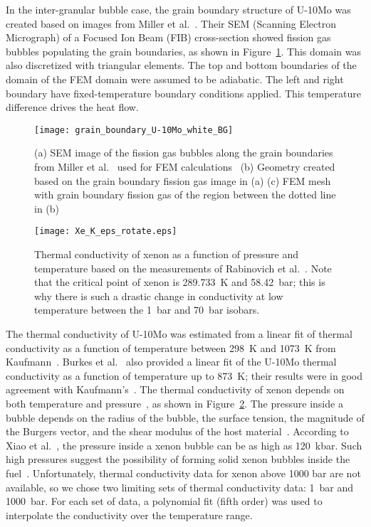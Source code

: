 In the inter-granular bubble case, the grain boundary structure of U-10Mo was created based on images from Miller et al.~\cite{miller2012advantages}. Their SEM (Scanning Electron Micrograph) of a Focused Ion Beam (FIB) cross-section showed fission gas bubbles populating the grain boundaries, as shown in Figure~\ref{fig_Xe_SEM}. This domain was also discretized with triangular elements. The top and bottom boundaries of the domain of the FEM domain were assumed to be adiabatic. The left and right boundary have fixed-temperature boundary conditions applied. This temperature difference drives the heat flow. 


\begin{figure}%
\centering
\texttt{[image: grain\_boundary\_U-10Mo\_white\_BG]}
\caption{(a) SEM image of the fission gas bubbles along the grain boundaries from Miller et al.~\cite{miller2012advantages} used for FEM calculations~\cite{miller2012advantages} (b) Geometry created based on the grain boundary fission gas image in (a) (c) FEM mesh with grain boundary fission gas of the region between the dotted line in  (b) }
\label{fig_Xe_SEM}
\end{figure}
\begin{figure}
\centering
\texttt{[image: Xe\_K\_eps\_rotate.eps]}
\caption{Thermal conductivity of xenon as a function of pressure and
temperature based on the measurements of
Rabinovich et al.~\cite{rabinovich1987thermophysical}.
Note that the critical point of xenon is 289.733~K and 58.42~bar; this is why
there is such a drastic change in conductivity at low temperature between the
1~bar and 70~bar isobars.}
\label{fig_Xe_pressure}
\end{figure}

The thermal conductivity of U-10Mo was estimated from a linear fit of thermal conductivity as a function of temperature between 298~K and 1073~K from Kaufmann~\cite{kaufmann1962nuclear}. Burkes et al.~\cite{burkes2010thermo} also provided a linear fit of the U-10Mo thermal conductivity as a function of temperature up to 873~K; their results were in good agreement with Kaufmann's~\cite{kaufmann1962nuclear}. The thermal conductivity of xenon depends on both temperature and pressure~\cite{rabinovich1987thermophysical}, as shown in Figure~\ref{fig_Xe_pressure}. The pressure inside a bubble depends on the radius of the bubble, the surface tension, the magnitude of the Burgers vector, and the shear modulus of the host material~\cite{greenwood1959role,trinkaus1983energetics}. According to Xiao et al.~\cite{xiao2015atomistic}, the pressure inside a xenon bubble can be as high as 120~kbar. Such high pressures suggest the possibility of forming solid xenon bubbles inside the fuel~\cite{thomas1991condensed,ross1980condensed,zheng2014thermodynamics}. Unfortunately, thermal conductivity data for xenon above 1000 bar are not available, so we chose two limiting sets of thermal conductivity data: 1~bar and 1000~bar. For each set of data, a polynomial fit (fifth order) was used to interpolate the conductivity over the temperature range.

